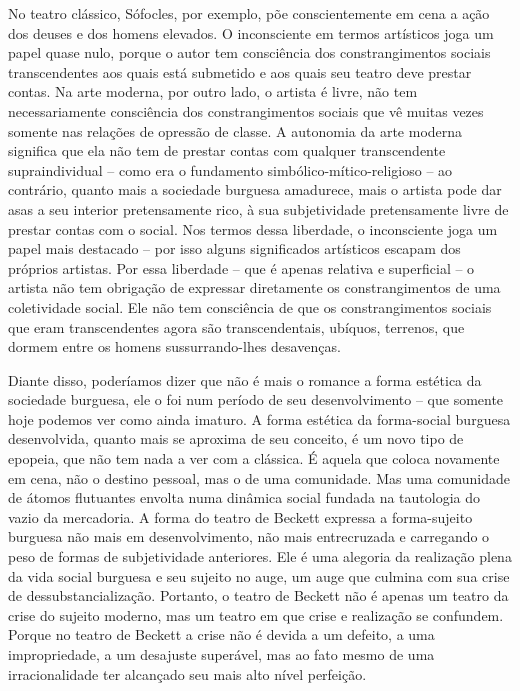 No teatro clássico, Sófocles, por exemplo, põe conscientemente em cena a
ação dos deuses e dos homens elevados. O inconsciente em termos
artísticos joga um papel quase nulo, porque o autor tem consciência dos
constrangimentos sociais transcendentes aos quais está submetido e aos
quais seu teatro deve prestar contas. Na arte moderna, por outro lado, o
artista é livre, não tem necessariamente consciência dos
constrangimentos sociais que vê muitas vezes somente nas relações de
opressão de classe. A autonomia da arte moderna significa que ela não
tem de prestar contas com qualquer transcendente supraindividual -- como
era o fundamento simbólico-mítico-religioso -- ao contrário, quanto mais
a sociedade burguesa amadurece, mais o artista pode dar asas a seu
interior pretensamente rico, à sua subjetividade pretensamente livre de
prestar contas com o social. Nos termos dessa liberdade, o inconsciente
joga um papel mais destacado -- por isso alguns significados artísticos
escapam dos próprios artistas. Por essa liberdade -- que é apenas
relativa e superficial -- o artista não tem obrigação de expressar
diretamente os constrangimentos de uma coletividade social. Ele não tem
consciência de que os constrangimentos sociais que eram transcendentes
agora são transcendentais, ubíquos, terrenos, que dormem entre os homens
sussurrando-lhes desavenças.

Diante disso, poderíamos dizer que não é mais o romance a forma estética
da sociedade burguesa, ele o foi num período de seu desenvolvimento --
que somente hoje podemos ver como ainda imaturo. A forma estética da
forma-social burguesa desenvolvida, quanto mais se aproxima de seu
conceito, é um novo tipo de epopeia, que não tem nada a ver com a
clássica. É aquela que coloca novamente em cena, não o destino pessoal,
mas o de uma comunidade. Mas uma comunidade de átomos flutuantes envolta
numa dinâmica social fundada na tautologia do vazio da mercadoria. A
forma do teatro de Beckett expressa a forma-sujeito burguesa não mais em
desenvolvimento, não mais entrecruzada e carregando o peso de formas de
subjetividade anteriores. Ele é uma alegoria da realização plena da vida
social burguesa e seu sujeito no auge, um auge que culmina com sua crise
de dessubstancialização. Portanto, o teatro de Beckett não é apenas um
teatro da crise do sujeito moderno, mas um teatro em que crise e
realização se confundem. Porque no teatro de Beckett a crise não é
devida a um defeito, a uma impropriedade, a um desajuste superável, mas
ao fato mesmo de uma irracionalidade ter alcançado seu mais alto nível
perfeição.

